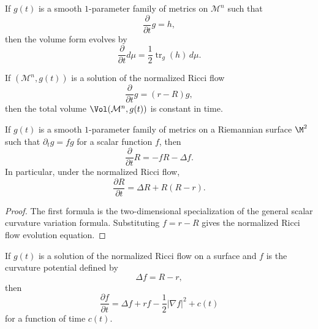 \begin{corollary}
\label{ch05-cor-area-form-evolution}

If \(g(t)\) is a smooth \(1\)-parameter family of metrics on \(\mathcal{M}^n\) such that
\[
\frac{\partial}{\partial t}g = h,
\]
then the volume form evolves by
\[
\frac{\partial}{\partial t}d\mu = \frac12 \operatorname{tr}_g(h)\,d\mu.
\]
\end{corollary}

\begin{corollary}
\label{ch05-cor-area-preservation}

If \((\mathcal{M}^n,g(t))\) is a solution of the normalized Ricci flow
\[
\frac{\partial}{\partial t}g=(r-R)g,
\]
then the total volume \(\Vol(\mathcal M^n,g(t))\) is constant in time.
\end{corollary}

\begin{lemma}
\label{ch05-lem-scalar-curvature-evolution-surface}

If \(g(t)\) is a smooth \(1\)-parameter family of metrics on a Riemannian surface \(\M^2\) such that \(\partial_t g = f g\) for a scalar function \(f\), then
\[
\frac{\partial}{\partial t}R = -fR -\Delta f.
\]
In particular, under the normalized Ricci flow,
\[
\frac{\partial R}{\partial t}=\Delta R+R(R-r).
\]
\end{lemma}

\begin{proof}
\sketch The first formula is the two-dimensional specialization of the general scalar curvature variation formula. Substituting \(f=r-R\) gives the normalized Ricci flow evolution equation.
\end{proof}

\begin{corollary}
\label{ch05-cor-curvature-potential-evolution}

If \(g(t)\) is a solution of the normalized Ricci flow on a surface and \(f\) is the curvature potential defined by
\[
\Delta f = R-r,
\]
then
\[
\frac{\partial f}{\partial t}=\Delta f + r f - \frac12 |\nabla f|^2 + c(t)
\]
for a function of time \(c(t)\).
\end{corollary}

